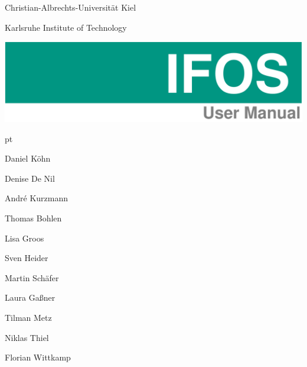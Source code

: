 \thispagestyle{empty}

\sffamily
\noindent
Christian-Albrechts-Universität Kiel

\noindent
Karlsruhe Institute of Technology
\newline

\noindent\includegraphics[width=1.0\textwidth]{IFOS_title1.png}

\begin{center}
\begin{minipage}[t]{1.00\textwidth}
\begingroup
{} pt
\begin{minipage}[h]{0.2\textwidth}

\vspace{7cm}

Daniel K\"ohn

Denise De Nil

Andr\'{e} Kurzmann

Thomas Bohlen

Lisa Groos

Sven Heider

Martin Sch\"afer

Laura Ga\ss ner

Tilman Metz

Niklas Thiel

Florian Wittkamp

\end{minipage}
\hfill
\begin{minipage}[h]{0.65\textwidth}


\end{minipage}
\end{minipage}
\end{center}
